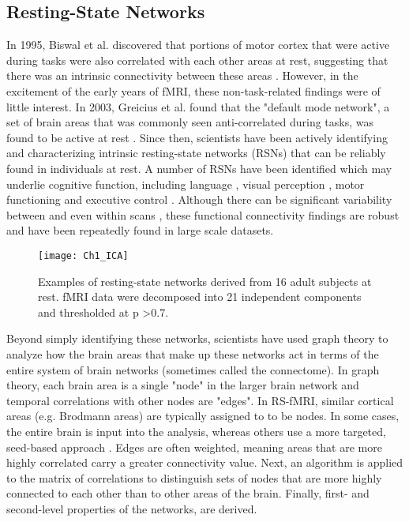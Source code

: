 \subsection{Resting-State Networks}
In 1995, Biswal et al. discovered that portions of motor cortex that were active during tasks were also correlated with each other areas at rest, suggesting that there was an intrinsic connectivity between these areas \cite{Biswal1995}. However, in the excitement of the early years of fMRI, these non-task-related findings were of little interest. In 2003, Greicius et al. found that the "default mode network", a set of brain areas that was commonly seen anti-correlated during tasks, was found to be active at rest \cite{Greicius2003}. Since then, scientists have been actively identifying and characterizing intrinsic resting-state networks (RSNs) that can be reliably found in individuals at rest. A number of RSNs have been identified which may underlie cognitive function, including language \cite{Cordes2000, Hampson2002}, visual perception \cite{Cordes2000, Simmons2012}, motor functioning \cite{Biswal1995} and executive control \cite{Seeley2007, Simmons2012}. Although there can be significant variability between and even within scans \cite{Honey2009}, these functional connectivity findings are robust and have been repeatedly found in large scale datasets.

\begin{figure}[t]
    \centering
    \texttt{[image: Ch1\_ICA]}
    \caption[Examples of resting-state networks.]{Examples of resting-state networks derived from 16 adult subjects at rest. fMRI data were decomposed into 21 independent components and thresholded at p \textgreater 0.7.} 
\end{figure}

Beyond simply identifying these networks, scientists have used graph theory to analyze how the brain areas that make up these networks act in terms of the entire system of brain networks (sometimes called the connectome). In graph theory, each brain area is a single "node" in the larger brain network and temporal correlations with other nodes are "edges". In RS-fMRI, similar cortical areas (e.g. Brodmann areas) are typically assigned to to be nodes. In some cases, the entire brain is input into the analysis, whereas others use a more targeted, seed-based approach \cite{Vogel2010}.  Edges are often weighted, meaning areas that are more highly correlated carry a greater connectivity value. Next, an algorithm is applied to the matrix of correlations to distinguish sets of nodes that are more highly connected to each other than to other areas of the brain. Finally, first- and second-level properties of the networks, are derived.

